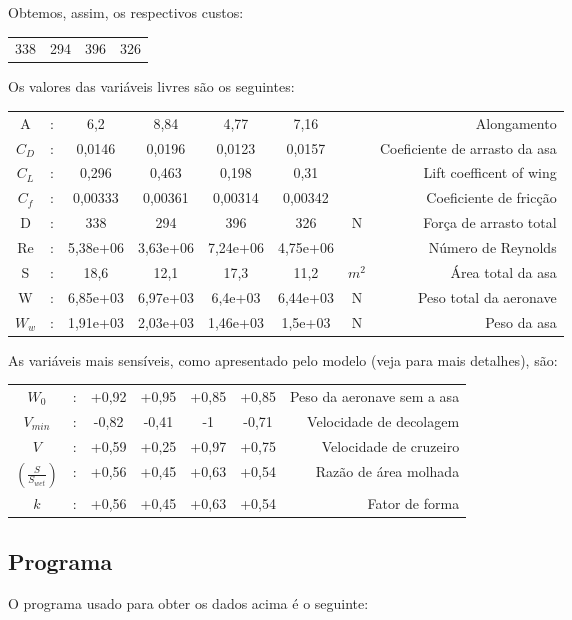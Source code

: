 \documentclass{article}
\begin{document}
Obtemos, assim, os respectivos custos:

\begin{tabular}{c c c c}
  338 & 294 & 396 & 326
\end{tabular}

Os valores das variáveis livres são os seguintes:

\begin{tabular}{c c c c c c c r}
  A & : & 6,2 & 8,84 & 4,77 & 7,16 & & Alongamento \\ $C_D$ & : &
  0,0146 & 0,0196 & 0,0123 & 0,0157 & & Coeficiente de arrasto da asa
  \\ $C_L$ & : & 0,296 & 0,463 & 0,198 & 0,31 & & Lift coefficent of
  wing \\ $C_f$ & : & 0,00333 & 0,00361 & 0,00314 & 0,00342 & &
  Coeficiente de fricção \\ D & : & 338 & 294 & 396 & 326 & N & Força
  de arrasto total \\ Re & : & 5,38e+06 & 3,63e+06 & 7,24e+06 &
  4,75e+06 & & Número de Reynolds \\ S & : & 18,6 & 12,1 & 17,3 & 11,2
  & $m^2$ & Área total da asa \\ W & : & 6,85e+03 & 6,97e+03 & 6,4e+03
  & 6,44e+03 & N & Peso total da aeronave \\ $W_w$ & : & 1,91e+03 &
  2,03e+03 & 1,46e+03 & 1,5e+03 & N & Peso da asa \\
\end{tabular}

As variáveis mais sensíveis, como apresentado pelo modelo (veja
\cite{gpkit} para mais detalhes), são:

\begin{tabular}{c c c c c c r}
  $ W_0$ &: & +0,92 & +0,95 & +0,85 & +0,85 & Peso da aeronave sem a asa
  \\ $ V_{min}$ &: & -0,82 & -0,41 & -1 & -0,71 & Velocidade de
  decolagem \\ $ V$ &: & +0,59 & +0,25 & +0,97 & +0,75 & Velocidade de
  cruzeiro \\ $(\frac{S}{S_{wet}})$ &: & +0,56 & +0,45 & +0,63 & +0,54
  & Razão de área molhada \\ $ k$ &: & +0,56 & +0,45 & +0,63 & +0,54 &
  Fator de forma
\end{tabular}

\pagebreak
\subsection*{Programa}
O programa usado para obter os dados acima é o seguinte:
\end{document}
